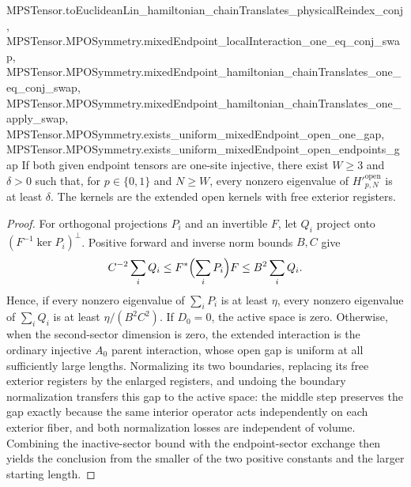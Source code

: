 \begin{lemma}
{        MPSTensor.toEuclideanLin_hamiltonian_chainTranslates_physicalReindex_conj,
        MPSTensor.MPOSymmetry.mixedEndpoint_localInteraction_one_eq_conj_swap,
        MPSTensor.MPOSymmetry.mixedEndpoint_hamiltonian_chainTranslates_one_eq_conj_swap,
        MPSTensor.MPOSymmetry.mixedEndpoint_hamiltonian_chainTranslates_one_apply_swap,
        MPSTensor.MPOSymmetry.exists_uniform_mixedEndpoint_open_one_gap,
        MPSTensor.MPOSymmetry.exists_uniform_mixedEndpoint_open_endpoints_gap}
    \leanok
    If both given endpoint tensors are one-site injective, there exist $W\geq3$ and
    $\delta>0$ such that, for $p\in\{0,1\}$ and $N\geq W$, every
    nonzero eigenvalue of $H'^{\mathrm{open}}_{p,N}$ is at least $\delta$.
    The kernels are the extended open kernels with free
    exterior registers.
\end{lemma}
\begin{proof}
    \leanok
    For orthogonal projections $P_i$ and an invertible $F$, let $Q_i$
    project onto $(F^{-1}\ker P_i)^\perp$. Positive forward and inverse
    norm bounds $B,C$ give
    \begin{align}
        C^{-2}\sum_iQ_i\leq F^*\Bigl(\sum_iP_i\Bigr)F
        \leq B^2\sum_iQ_i.
    \end{align}
    Hence, if every nonzero eigenvalue of $\sum_iP_i$ is at least $\eta$,
    every nonzero eigenvalue of $\sum_iQ_i$ is at least $\eta/(B^2C^2)$.
    If $D_0=0$, the active space is zero. Otherwise, when the
    second-sector dimension is zero, the extended
    interaction is the ordinary injective $A_0$ parent interaction,
    whose open gap is uniform at all sufficiently large lengths.
    Normalizing its two boundaries, replacing its free exterior registers
    by the enlarged registers, and undoing the boundary normalization
    transfers this gap to the active space:
    the middle step preserves the gap exactly because the same interior
    operator acts independently on each exterior fiber, and both normalization
    losses are independent of volume. Combining the inactive-sector bound
    with the endpoint-sector exchange then yields the conclusion from the smaller of the two
    positive constants and the larger starting length.
\end{proof}
